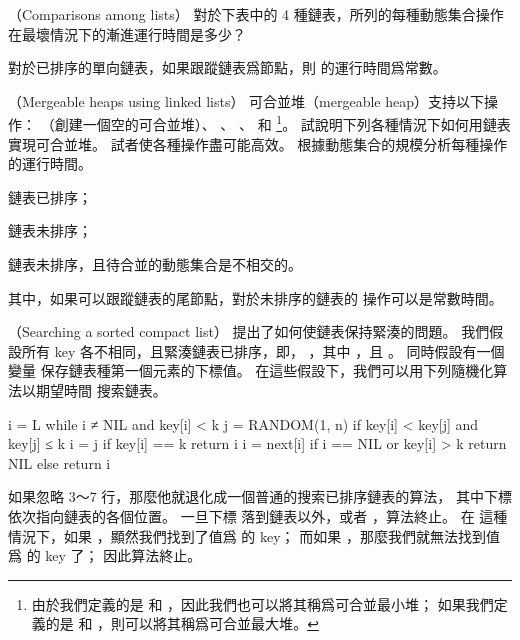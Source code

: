 \startsubject[
  title={Problems},
]

\startPROBLEM
（Comparisons among lists）
對於下表中的 4 種鏈表，所列的每種動態集合操作在最壞情況下的漸進運行時間是多少？
\stopPROBLEM

\startANSWER


對於已排序的單向鏈表，如果跟蹤鏈表爲節點，則  的運行時間爲常數。
\stopANSWER

\startPROBLEM
（Mergeable heaps using linked lists）
{\EMP 可合並堆}（{\EMP mergeable heap}）支持以下操作： （創建一個空的可合並堆）、
 、 、  和 \footnote{%
由於我們定義的是  和 ，因此我們也可以將其稱爲{\EMP 可合並最小堆}；
如果我們定義的是  和 ，則可以將其稱爲{\EMP 可合並最大堆}。
}。
試說明下列各種情況下如何用鏈表實現可合並堆。
試者使各種操作盡可能高效。
根據動態集合的規模分析每種操作的運行時間。
\startigBase[a]
\item 鏈表已排序；
\item 鏈表未排序；
\item 鏈表未排序，且待合並的動態集合是不相交的。
\stopigBase
\stopPROBLEM

\startANSWER


其中，如果可以跟蹤鏈表的尾節點，對於未排序的鏈表的  操作可以是常數時間。
\stopANSWER

\startPROBLEM
（Searching a sorted compact list）
 提出了如何使鏈表保持緊湊的問題。
我們假設所有 key 各不相同，且緊湊鏈表已排序，即，
 ，其中 ，且 。
同時假設有一個變量  保存鏈表種第一個元素的下標值。
在這些假設下，我們可以用下列隨機化算法以期望時間  搜索鏈表。

\startCLRS
i = L
while i ≠ NIL and key[i] < k
	j = RANDOM(1, n)
	if key[i] < key[j] and key[j] ≤ k
		i = j
		if key[i] == k
			return i
	i = next[i]
if i == NIL or key[i] > k
	return NIL
else
	return i
\stopCLRS

如果忽略 3～7 行，那麼他就退化成一個普通的搜索已排序鏈表的算法，
其中下標  依次指向鏈表的各個位置。
一旦下標  落到鏈表以外，或者 ，算法終止。
在  這種情況下，如果 ，顯然我們找到了值爲  的 key；
而如果 ，那麼我們就無法找到值爲  的 key 了；
因此算法終止。

